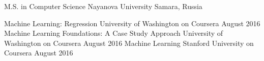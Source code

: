 \documentclass[9pt,a4paper]{juicv}
\begin{document}
\begin{paracol}{2}
    \vspace{6pt}
    {
        \raggedright
        \cvTag{\LaTeX}
    }

    \cvRightEventNoBody
        {M.S. in Computer Science}
        {Nayanova University}
        {}
        {Samara, Russia}

    \cvRightEventNoBody
        {Machine Learning: Regression}
        {University of Washington on Coursera}
        {August 2016}
        {}
    \cvRightEventNoBody
        {Machine Learning Foundations: A Case Study Approach}
        {University of Washington on Coursera}
        {August 2016}
        {}
    \cvRightEventNoBody
        {Machine Learning}
        {Stanford University on Coursera}
        {August 2016}
        {}

\end{paracol}
\end{document}
